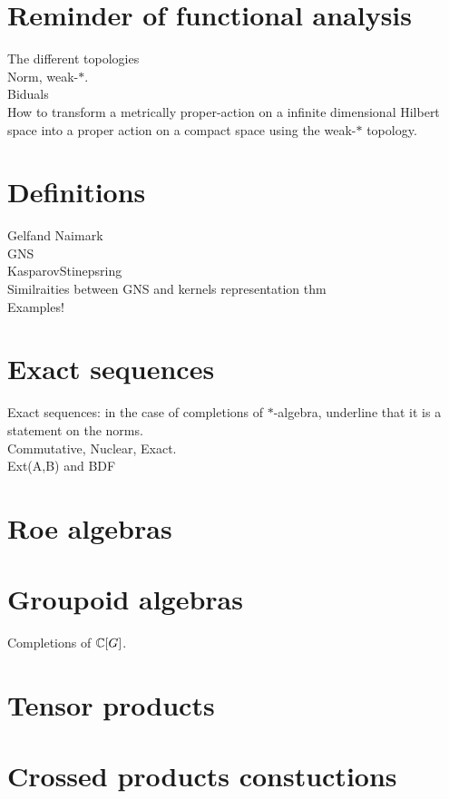 \section{Reminder of functional analysis}

The different topologies\\
Norm, weak-$*$.\\
Biduals\\

How to transform a metrically proper-action on a infinite dimensional Hilbert space into a proper action on a compact space using the weak-$*$ topology.

\section{Definitions}

Gelfand Naimark \\
GNS \\
KasparovStinepsring\\
Similraities between GNS and kernels representation thm\\

Examples!
\section{Exact sequences}

Exact sequences: in the case of completions of $*$-algebra, underline that it is a statement on the norms.\\

Commutative, Nuclear, Exact.\\

Ext(A,B) and BDF\\

\section{Roe algebras}

\section{Groupoid algebras}

Completions of $\mathbb C[G]$.

\section{Tensor products}

\section{Crossed products constuctions}

